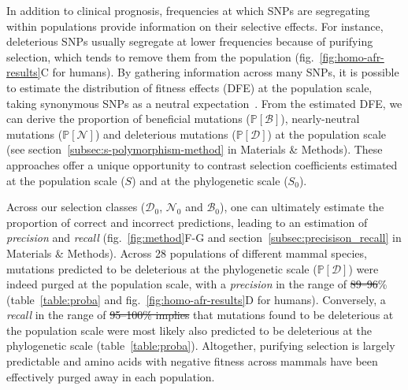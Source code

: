 \documentclass{article}
\newcommand{\proba}{\mathbb{P}}
\newcommand{\Sphy}{S_{0}}
\newcommand{\SphyDel}{\mathcal{D}_0}
\newcommand{\SphyNeu}{\mathcal{N}_0}
\newcommand{\SphyBen}{\mathcal{B}_0}
\newcommand{\Spop}{S}
\newcommand{\SpopDel}{\mathcal{D}}
\newcommand{\SpopNeu}{\mathcal{N}}
\newcommand{\SpopBen}{\mathcal{B}}
\newcommand{\ProbaPopDel}{\proba [ \SpopDel]}
\newcommand{\ProbaPopNeu}{\proba [ \SpopNeu ]}
\newcommand{\ProbaPopBen}{\proba [ \SpopBen ]}
\providecommand{\DIFaddtex}[1]{{\protect\color{blue}\uwave{#1}}} %
\providecommand{\DIFdeltex}[1]{{\protect\color{red}\sout{#1}}}                      %
\providecommand{\DIFaddbegin}{} %
\providecommand{\DIFaddend}{} %
\providecommand{\DIFdelbegin}{} %
\providecommand{\DIFdelend}{} %
\providecommand{\DIFadd}[1]{\texorpdfstring{\DIFaddtex{#1}}{#1}} %
\providecommand{\DIFdel}[1]{\texorpdfstring{\DIFdeltex{#1}}{}} %
\newcommand{\DIFscaledelfig}{0.5}
\newlength{\DIFdelgraphicswidth} %
\newlength{\DIFdelgraphicsheight} %
\newcommand{\DIFaddincludegraphics}[2][]{{\color{blue}\fbox{\DIFOincludegraphics[#1]{#2}}}} %
\newcommand{\DIFdelincludegraphics}[2][]{%
\sbox{\DIFdelgraphicsbox}{\DIFOincludegraphics[#1]{#2}}%
\settoboxwidth{\DIFdelgraphicswidth}{\DIFdelgraphicsbox} %
\settoboxtotalheight{\DIFdelgraphicsheight}{\DIFdelgraphicsbox} %
\scalebox{\DIFscaledelfig}{%
\parbox[b]{\DIFdelgraphicswidth}{\usebox{\DIFdelgraphicsbox}\\[-\baselineskip] \rule{\DIFdelgraphicswidth}{0em}}\llap{\resizebox{\DIFdelgraphicswidth}{\DIFdelgraphicsheight}{%
\setlength{\unitlength}{\DIFdelgraphicswidth}%
\begin{picture}(1,1)%
\thicklines\linethickness{2pt} %
{\color[rgb]{1,0,0}\put(0,0){\framebox(1,1){}}}%
{\color[rgb]{1,0,0}\put(0,0){\line( 1,1){1}}}%
{\color[rgb]{1,0,0}\put(0,1){\line(1,-1){1}}}%
\end{picture}%
}\hspace*{3pt}}} %
} %
\DeclareRobustCommand{\DIFaddbegin}{\DIFOaddbegin \let\includegraphics\DIFaddincludegraphics} %
\DeclareRobustCommand{\DIFaddend}{\DIFOaddend \let\includegraphics\DIFOincludegraphics} %
\DeclareRobustCommand{\DIFdelbegin}{\DIFOdelbegin \let\includegraphics\DIFdelincludegraphics} %
\DeclareRobustCommand{\DIFdelend}{\DIFOaddend \let\includegraphics\DIFOincludegraphics} %
\begin{document}
    In addition to clinical prognosis, frequencies at which SNPs are segregating within populations provide information on their selective effects.
    For instance, deleterious SNPs usually segregate at lower frequencies because of purifying selection, which tends to remove them from the population (fig.~\ref{fig:homo-afr-results}C for humans).
    By gathering information across many SNPs, it is possible to estimate the distribution of fitness effects (DFE) at the population scale, taking synonymous SNPs as a neutral expectation~\cite{eyre-walker_distribution_2006, eyre-walker_estimating_2009, galtier_adaptive_2016, tataru_inference_2017}.
    From the estimated DFE, we can derive the proportion of beneficial mutations ($\ProbaPopBen$), nearly-neutral mutations ($\ProbaPopNeu$) and deleterious mutations ($\ProbaPopDel$) at the population scale (see section~\ref{subsec:s-polymorphism-method} in Materials \& Methods).
    These approaches offer a unique opportunity to contrast selection coefficients estimated at the population scale ($\Spop$) and at the phylogenetic scale ($\Sphy$).

    Across our selection classes ($\SphyDel$, $\SphyNeu$ and $\SphyBen$), one can ultimately estimate the proportion of correct and incorrect predictions, leading to an estimation of \textit{precision} and \textit{recall} (fig.~\ref{fig:method}F-G and section~\ref{subsec:precisison_recall} in Materials \& Methods).
    Across 28 populations of different mammal species, mutations predicted to be deleterious at the phylogenetic scale ($\ProbaPopDel$) were indeed purged at the population scale, with a \textit{precision} in the range of \DIFdelbegin \DIFdel{89--96}\DIFdelend \DIFaddbegin \DIFadd{90--97}\DIFaddend \% (table~\ref{table:proba} and fig.~\ref{fig:homo-afr-results}D for humans).
    Conversely, a \textit{recall} in the range of \DIFdelbegin \DIFdel{95--100\% implies }\DIFdelend \DIFaddbegin \DIFadd{96--100\% implied }\DIFaddend that mutations found to be deleterious at the population scale were most likely also predicted to be deleterious at the phylogenetic scale (table~\ref{table:proba}).
    Altogether, purifying selection is largely predictable and amino acids with negative fitness across mammals have been effectively purged away in each population.
\end{document}
